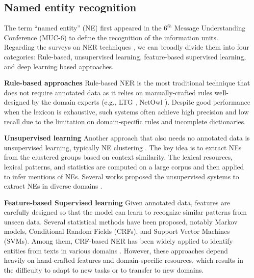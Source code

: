\documentclass[runningheads]{llncs}
\begin{document}
\subsection{Named entity recognition}
The term “named entity” (NE) first appeared in the $6^{th}$ Message Understanding Conference (MUC-6) \cite{grishman1996message} to define the recognition of the information units. Regarding the surveys on NER techniques \cite{palshikar2013techniques,yadav2019survey,li2020survey}, we can broadly divide them into four categories: Rule-based, unsupervised learning, feature-based supervised learning, and deep learning based approaches.










\noindent \textbf{Rule-based approaches}
Rule-based NER is the most traditional technique that does not require annotated data as it relies on  manually-crafted rules well-designed by the domain experts (e.g., LTG \cite{mikheev1999named}, NetOwl \cite{krupka2005description}). Despite good performance when the lexicon is exhaustive, such systems often achieve high precision and low recall due to the limitation on domain-specific rules and incomplete dictionaries.

\noindent \textbf{Unsupervised learning}
Another approach that also needs no annotated data is unsupervised learning, typically NE clustering \cite{collins1999unsupervised}. The key idea is to extract NEs from the clustered groups based on context similarity. The lexical resources, lexical patterns, and statistics are computed on a large corpus and then applied to infer mentions of NEs. Several works proposed the unsupervised systems to extract NEs in diverse domains \cite{etzioni2005unsupervised,nadeau2006unsupervised}.

\noindent \textbf{Feature-based Supervised learning}
Given annotated data, features are carefully designed so that the model can learn to recognize similar patterns from unseen data. Several statistical methods have been proposed, notably Markov models, Conditional Random Fields (CRFs), and Support Vector Machines (SVMs). Among them, CRF-based NER has been widely applied to identify entities from texts in various domains \cite{liu2020hamner,ritter2011named,rocktaschel2012chemspot}.
However, these approaches depend heavily on hand-crafted features and domain-specific resources, which results in the difficulty to adapt to new tasks or to transfer to new domains.
\end{document}
